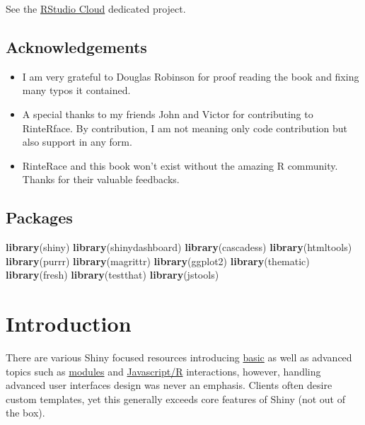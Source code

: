 \documentclass[]{book}
\newenvironment{Shaded}{\begin{snugshade}}{\end{snugshade}}
\newcommand{\KeywordTok}[1]{\textcolor[rgb]{0.13,0.29,0.53}{\textbf{#1}}}
\newcommand{\NormalTok}[1]{#1}
\providecommand{\tightlist}{%
  \setlength{\itemsep}{0pt}\setlength{\parskip}{0pt}}
\begin{document}
See the \href{https://rstudio.cloud}{RStudio Cloud} dedicated project.

\hypertarget{acknowledgements}{%
\section*{Acknowledgements}\label{acknowledgements}}

\begin{itemize}
\tightlist
\item
  I am very grateful to Douglas Robinson for proof reading the book and fixing many typos it contained.
\item
  A special thanks to my friends John and Victor for contributing to RinteRface. By contribution, I am not meaning only code contribution but also support in any form.
\item
  RinteRace and this book won't exist without the amazing R community. Thanks for their valuable feedbacks.
\end{itemize}

\hypertarget{packages}{%
\section*{Packages}\label{packages}}

\begin{Shaded}
\begin{Highlighting}[]
\KeywordTok{library}\NormalTok{(shiny)}
\KeywordTok{library}\NormalTok{(shinydashboard)}
\KeywordTok{library}\NormalTok{(cascadess)}
\KeywordTok{library}\NormalTok{(htmltools)}
\KeywordTok{library}\NormalTok{(purrr)}
\KeywordTok{library}\NormalTok{(magrittr)}
\KeywordTok{library}\NormalTok{(ggplot2)}
\KeywordTok{library}\NormalTok{(thematic)}
\KeywordTok{library}\NormalTok{(fresh)}
\KeywordTok{library}\NormalTok{(testthat)}
\KeywordTok{library}\NormalTok{(jstools)}
\end{Highlighting}
\end{Shaded}

\hypertarget{intro}{%
\chapter{Introduction}\label{intro}}

There are various Shiny focused resources introducing \href{https://shiny.rstudio.com/tutorial/}{basic} as well as advanced topics such as \href{https://shiny.rstudio.com/articles/\#modules}{modules} and \href{https://js4shiny.com}{Javascript/R} interactions, however, handling advanced user interfaces design was never an emphasis. Clients often desire custom templates, yet this generally exceeds core features of Shiny (not out of the box).
\end{document}
